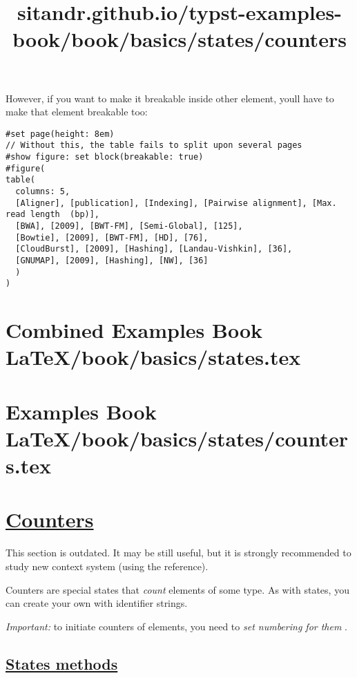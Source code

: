 However, if you want to make it breakable inside other element,
you\textquotesingle ll have to make that element breakable too:

\begin{verbatim}
#set page(height: 8em)
// Without this, the table fails to split upon several pages
#show figure: set block(breakable: true)
#figure(
table(
  columns: 5,
  [Aligner], [publication], [Indexing], [Pairwise alignment], [Max. read length  (bp)],
  [BWA], [2009], [BWT-FM], [Semi-Global], [125],
  [Bowtie], [2009], [BWT-FM], [HD], [76],
  [CloudBurst], [2009], [Hashing], [Landau-Vishkin], [36],
  [GNUMAP], [2009], [Hashing], [NW], [36]
  )
)
\end{verbatim}

\pandocbounded{}

\pandocbounded{}




\section{Combined Examples Book LaTeX/book/basics/states.tex}
\section{Examples Book LaTeX/book/basics/states/counters.tex}
\title{sitandr.github.io/typst-examples-book/book/basics/states/counters}

\section{\texorpdfstring{\hyperref[counters]{Counters}}{Counters}}\label{counters}

This section is outdated. It may be still useful, but it is strongly
recommended to study new context system (using the reference).

Counters are special states that \emph{count} elements of some type. As
with states, you can create your own with identifier strings.

\emph{Important:} to initiate counters of elements, you need to
\emph{set numbering for them} .

\subsection{\texorpdfstring{\hyperref[states-methods]{States
methods}}{States methods}}\label{states-methods}

